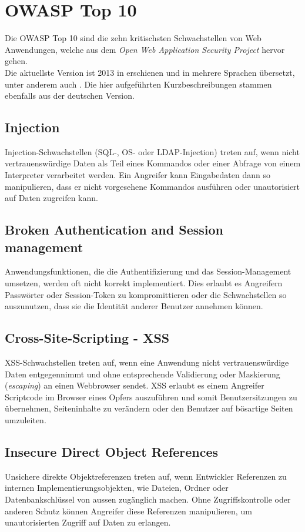 \section{OWASP Top 10}
Die OWASP Top 10 sind die zehn kritischsten Schwachstellen von Web Anwendungen, welche aus dem \textit{Open Web Application Security Project} hervor gehen.\\

Die aktuellste Version ist 2013 in  erschienen und in mehrere Sprachen übersetzt, unter anderem auch . Die hier aufgeführten Kurzbeschreibungen stammen ebenfalls aus der deutschen Version.

\subsection{Injection}
Injection-Schwachstellen (SQL-, OS- oder LDAP-Injection) treten auf, wenn nicht vertrauenswürdige Daten als Teil eines Kommandos oder einer Abfrage von einem Interpreter verarbeitet werden. Ein Angreifer kann Eingabedaten dann so manipulieren, dass er nicht vorgesehene Kommandos ausführen oder unautorisiert auf Daten zugreifen kann.

\subsection{Broken Authentication and Session management}
Anwendungsfunktionen, die die Authentifizierung und das Session-Management umsetzen, werden oft nicht korrekt implementiert. Dies erlaubt es Angreifern Passwörter oder Session-Token zu kompromittieren oder die Schwachstellen so auszunutzen, dass sie die Identität anderer Benutzer annehmen können.

\subsection{Cross-Site-Scripting - XSS}
XSS-Schwachstellen treten auf, wenn eine Anwendung nicht vertrauenswürdige Daten entgegennimmt und ohne entsprechende Validierung oder Maskierung (\textit{escaping}) an einen Webbrowser sendet. XSS erlaubt es einem Angreifer Scriptcode im Browser eines Opfers auszuführen und somit Benutzersitzungen zu übernehmen, Seiteninhalte zu verändern oder den Benutzer auf bösartige Seiten umzuleiten.

\subsection{Insecure Direct Object References}
Unsichere direkte Objektreferenzen treten auf, wenn Entwickler Referenzen zu internen Implementierungsobjekten, wie Dateien, Ordner oder Datenbankschlüssel von aussen zugänglich machen. Ohne Zugriffskontrolle oder anderen Schutz können Angreifer diese Referenzen manipulieren, um unautorisierten Zugriff auf Daten zu erlangen.


